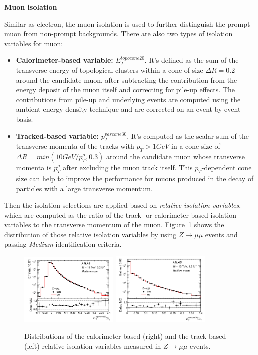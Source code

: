 \textbf{Muon isolation}

Similar as electron, the muon isolation is used to further distinguish the prompt muon from non-prompt backgrounds.
There are also two types of isolation variables for muon:
\begin{itemize}
	\item \textbf{Calorimeter-based variable:} $E_{T}^{topocone20}$. It's defined as the sum of the transverse energy of topological clusters within a cone of size $\Delta R = 0.2$ around the candidate muon, after subtracting the contribution from the energy deposit of the muon itself and correcting for pile-up effects. The contributions from pile-up and underlying events are computed using the ambient energy-density technique\cite{CACCIARI2008119} and are corrected on an event-by-event basis.
	\item \textbf{Tracked-based variable:} $p_{T}^{varcone30}$. It's computed as the scalar sum of the transverse momenta of the tracks with $p_{T} > 1 GeV$ in a cone size of $\Delta R = min (10 GeV/p_{T}^{\mu}, 0.3)$ around the candidate muon whose transverse momenta is $p_{T}^{\mu}$ after excluding the muon track itself. This $p_{T}$-dependent cone size can help to improve the performance for muons produced in the decay of particles with a large transverse momentum.
\end{itemize}

Then the isolation selections are applied based on \textit{relative isolation variables}, 
which are computed as the ratio of the track- or calorimeter-based isolation variables to the transverse momentum of the muon.
Figure~\ref{fig:muon_iso} shows the distribution of those relative isolation variables by using $Z \rightarrow \mu\mu$ events and passing \textit{Medium} identification criteria.
\begin{figure}[!htb]
  \centering
  \includegraphics[width=0.42\textwidth]{figures/Simulation/muon_iso_calo.png}
  \includegraphics[width=0.42\textwidth]{figures/Simulation/muon_iso_track.png}
  \caption{Distributions of the calorimeter-based (right) and the track-based (left) relative isolation variables measured in $Z \rightarrow \mu\mu$ events. }
  \label{fig:muon_iso}
\end{figure}
